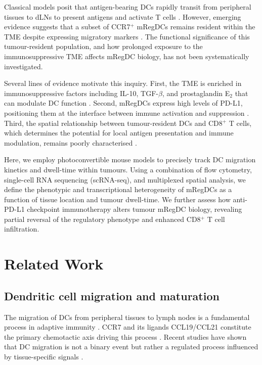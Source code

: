 \documentclass[11pt]{article}
\begin{document}
Classical models posit that antigen-bearing DCs rapidly transit from peripheral tissues to dLNs to present antigens and activate T cells \citep{merad2013,worbs2017}. However, emerging evidence suggests that a subset of CCR7$^{+}$ mRegDCs remains resident within the TME despite expressing migratory markers \citep{binnewies2019,veglia2021}. The functional significance of this tumour-resident population, and how prolonged exposure to the immunosuppressive TME affects mRegDC biology, has not been systematically investigated.

Several lines of evidence motivate this inquiry. First, the TME is enriched in immunosuppressive factors including IL-10, TGF-$\beta$, and prostaglandin E$_2$ that can modulate DC function \citep{gabrilovich2012,dejong2019}. Second, mRegDCs express high levels of PD-L1, positioning them at the interface between immune activation and suppression \citep{maier2020,cheng2021}. Third, the spatial relationship between tumour-resident DCs and CD8$^{+}$ T cells, which determines the potential for local antigen presentation and immune modulation, remains poorly characterised \citep{broz2014,spranger2017}.

Here, we employ photoconvertible mouse models to precisely track DC migration kinetics and dwell-time within tumours. Using a combination of flow cytometry, single-cell RNA sequencing (scRNA-seq), and multiplexed spatial analysis, we define the phenotypic and transcriptional heterogeneity of mRegDCs as a function of tissue location and tumour dwell-time. We further assess how anti-PD-L1 checkpoint immunotherapy alters tumour mRegDC biology, revealing partial reversal of the regulatory phenotype and enhanced CD8$^{+}$ T cell infiltration.

\section{Related Work}

\subsection{Dendritic cell migration and maturation}
The migration of DCs from peripheral tissues to lymph nodes is a fundamental process in adaptive immunity \citep{steinman2007,merad2013}. CCR7 and its ligands CCL19/CCL21 constitute the primary chemotactic axis driving this process \citep{forster1999,ohl2004}. Recent studies have shown that DC migration is not a binary event but rather a regulated process influenced by tissue-specific signals \citep{worbs2017}.
\end{document}
